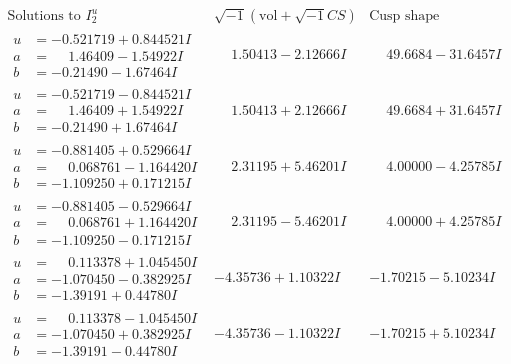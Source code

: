 \documentclass[1p]{elsarticle_modified}
\theoremstyle{definition}
\newcommand{\I}{\sqrt{-1}}
\begin{document}
$$\begin{array}{c|c|c}  
\text{Solutions to }I^u_{2}& \I (\text{vol} + \sqrt{-1}CS) & \text{Cusp shape}\\
 \hline 
\begin{aligned}
u &= -0.521719 + 0.844521 I \\
a &= \phantom{-}1.46409 - 1.54922 I \\
b &= -0.21490 - 1.67464 I\end{aligned}
 & \phantom{-}1.50413 - 2.12666 I & \phantom{-}49.6684 - 31.6457 I \\ \hline\begin{aligned}
u &= -0.521719 - 0.844521 I \\
a &= \phantom{-}1.46409 + 1.54922 I \\
b &= -0.21490 + 1.67464 I\end{aligned}
 & \phantom{-}1.50413 + 2.12666 I & \phantom{-}49.6684 + 31.6457 I \\ \hline\begin{aligned}
u &= -0.881405 + 0.529664 I \\
a &= \phantom{-}0.068761 - 1.164420 I \\
b &= -1.109250 + 0.171215 I\end{aligned}
 & \phantom{-}2.31195 + 5.46201 I & \phantom{-}4.00000 - 4.25785 I \\ \hline\begin{aligned}
u &= -0.881405 - 0.529664 I \\
a &= \phantom{-}0.068761 + 1.164420 I \\
b &= -1.109250 - 0.171215 I\end{aligned}
 & \phantom{-}2.31195 - 5.46201 I & \phantom{-}4.00000 + 4.25785 I \\ \hline\begin{aligned}
u &= \phantom{-}0.113378 + 1.045450 I \\
a &= -1.070450 - 0.382925 I \\
b &= -1.39191 + 0.44780 I\end{aligned}
 & -4.35736 + 1.10322 I & -1.70215 - 5.10234 I \\ \hline\begin{aligned}
u &= \phantom{-}0.113378 - 1.045450 I \\
a &= -1.070450 + 0.382925 I \\
b &= -1.39191 - 0.44780 I\end{aligned}
 & -4.35736 - 1.10322 I & -1.70215 + 5.10234 I \\ \hline\begin{aligned}

\end{aligned}
\end{array}$$
\end{document}
